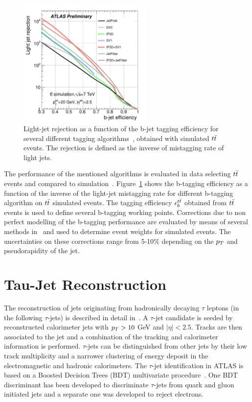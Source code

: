 \begin{figure}[tp]
     \begin{center}

            \includegraphics[width=0.6\textwidth]{figure/obj/btag_perf.pdf}

    \end{center}
    \caption{Light-jet rejection as a function of the b-jet tagging efficiency for several different tagging algorithms~\cite{btagPerf},
	obtained with simulated $t\bar{t}$ events. The rejection is defined as the inverse of mistagging rate of light jets.}
   \label{fig:beff}
\end{figure}

The performance of the mentioned algorithms is evaluated in data selecting $t\bar{t}$ events and compared to simulation~\cite{btagPerf}.
Figure~\ref{fig:beff} shows the b-tagging efficiency as a function of the inverse of the light-jet mistagging rate
for different b-tagging algorithm on $t\bar{t}$ simulated events. The tagging efficiency $\epsilon_b^{t\bar{t}}$ obtained from $t\bar{t}$ events
is used to define several b-tagging working points. Corrections due to non perfect modelling
of the b-tagging performance are evaluated by means of several methods
in~\cite{BtaggingScaleFactors, BtaggingScaleFactorsNew} and used to determine event weights for simulated events.
The uncertainties on these corrections  range from 5-10\%  depending on the $p_{T}$ and pseudorapidity of the jet.


\section{Tau-Jet Reconstruction}\label{sec:tau}
The reconstruction of jets originating from hadronically decaying $\tau$ leptons (in the following $\tau$-jets)
is described in detail in~\cite{AtlasCSCBook}.
A $\tau$-jet candidate is seeded by reconstructed calorimeter jets with $p_{T} > 10$ GeV and $|\eta| < 2.5$.
Tracks are then associated to the jet and a combination of the tracking and calorimeter information
is performed.  $\tau$-jets    can be distinguished from other 
jets by their low track multiplicity and a narrower clustering of energy deposit in the electromagnetic and hadronic calorimeters.
 The $\tau$-jet identification in ATLAS is based on a Boosted Decision Trees (BDT) multivariate procedure~\cite{ATLASTAUIDnew}.
One BDT discriminant has been developed to discriminate $\tau$-jets  from quark and gluon 
initiated jets and a separate one was developed to reject electrons.


